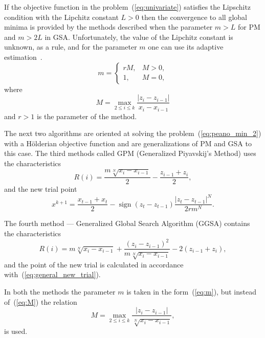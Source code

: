 \documentclass[preprint]{elsarticle}
\DeclareMathOperator{\sign}{sign}
\begin{document}
If the objective function in the problem~(\ref{eq:univariate}) satisfies the Lipschitz condition with the Lipchitz constant $L > 0$ then the convergence to all global minima is provided by the methods described when the parameter $m > L$ for PM and $m > 2L$ in GSA. Unfortunately, the value of the Lipchitz constant is unknown, as a rule, and for the parameter $m$ one can use its adaptive estimation~\cite{bib5,bib51}.
\begin{equation}
  \label{eq:m}
  m =
  \begin{cases}
    rM, & M > 0, \\
    1,  & M = 0,
  \end{cases}
\end{equation}
%
where
\begin{equation}
  \label{eq:M}
  M = \max_{2 \leq i \leq k} \frac{|z_i - z_{i - 1}|}{x_i - x_{i - 1}}
\end{equation}
%
and $r > 1$ is the parameter of the method.

The next two algorithms are oriented at solving the problem~(\ref{eq:peano_min_2}) with a H\"olderian objective function and are generalizations of PM and GSA to this case. The third methods called GPM (Generalized Piyavskij's Method) uses the characteristics
\begin{equation}
  R(i) = \frac{m \sqrt[N]{x_i - x_{i - 1}}}{2} - \frac{z_{i - 1} + z_i}{2},
\end{equation}
%
and the new trial point
\begin{equation}
  \label{eq:general_new_trial}
  x^{k + 1} = \frac{x_{t - 1} + x_t}{2} - \sign(z_t - z_{t - 1}) \frac{|z_t - z_{t - 1}|^N}{2 r m^N}.
\end{equation}

The fourth method --- Generalized Global Search Algorithm (GGSA) contains the characteristics
\begin{equation}
  R(i) = m \sqrt[N]{x_i - x_{i - 1}} + \frac{(z_i - z_{i - 1})^2}{m \sqrt[N]{x_i - x_{i - 1}}} - 2 (z_{i - 1} + z_i),
\end{equation}
%
and the point of the new trial is calculated in accordance with~(\ref{eq:general_new_trial}).

In both the methods the parameter $m$ is taken in the form~(\ref{eq:m}), but instead of~(\ref{eq:M}) the relation
\begin{equation}
  M = \max_{2 \leq i \leq k} \frac{|z_i - z_{i - 1}|}{\sqrt[N]{x_i - x_{i - 1}}},
\end{equation}
%
is used.
\end{document}
